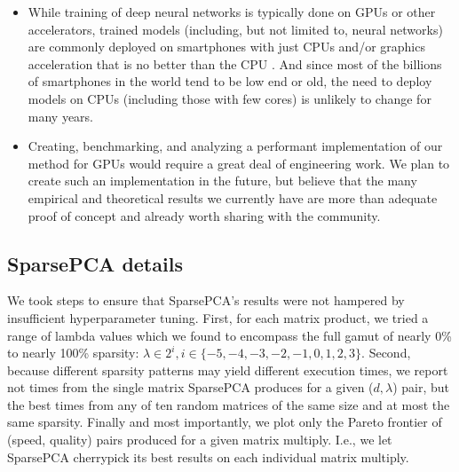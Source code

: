 \begin{itemize}
    \item While training of deep neural networks is typically done on GPUs or other accelerators, trained models (including, but not limited to, neural networks) are commonly deployed on smartphones with just CPUs and/or graphics acceleration that is no better than the CPU \cite{fbAtEdge}. And since most of the billions of smartphones in the world tend to be low end or old, the need to deploy models on CPUs (including those with few cores) is unlikely to change for many years.
    \item Creating, benchmarking, and analyzing a performant implementation of our method for GPUs would require a great deal of engineering work. We plan to create such an implementation in the future, but believe that the many empirical and theoretical results we currently have are more than adequate proof
    of concept and already worth sharing with the community. %
\end{itemize}


\subsection{SparsePCA details}

We took steps to ensure that SparsePCA's results were not hampered by insufficient hyperparameter tuning. First, for each matrix product, we tried a range of lambda values which we found to encompass the full gamut of nearly 0\% to nearly 100\% sparsity: $\lambda \in 2^i, i \in \{-5, -4, -3, -2, -1, 0, 1, 2, 3\}$. Second, because different sparsity patterns may yield different execution times, we report not times from the single matrix SparsePCA produces for a given ($d, \lambda$) pair, but the best times from any of ten random matrices of the same size and at most the same sparsity. Finally and most importantly, we plot only the Pareto frontier of (speed, quality) pairs produced for a given matrix multiply. I.e., we let SparsePCA cherrypick its best results on each individual matrix multiply.

